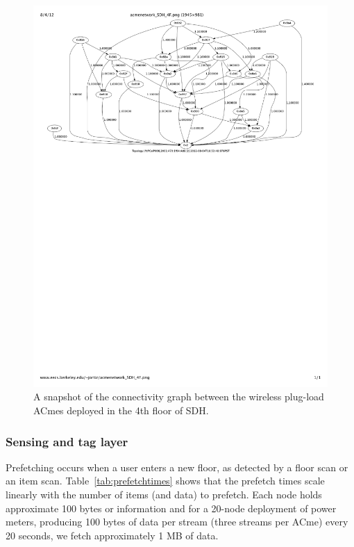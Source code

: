 \begin{figure}[htb!]
\begin{center}
\includegraphics[scale=0.8]{figs/acmenetwork_SDH_4F}
\caption{A snapshot of the connectivity graph between the wireless plug-load ACmes deployed in the 4th floor
of SDH.}
\label{fig:acmenetwork_SDH_4F}
\end{center}
\end{figure}
\subsubsection{Sensing and tag layer}

Prefetching occurs when a user enters a new floor, as detected by a floor scan or an item
scan.  Table~\ref{tab:prefetchtimes} shows that the prefetch times scale linearly with the number of
items (and data) to prefetch.  Each node holds approximate 100 bytes or information and for
a 20-node deployment of power meters, producing 100 bytes of data per stream (three streams per ACme) every 20 seconds, we fetch 
approximately 1 MB of data.

